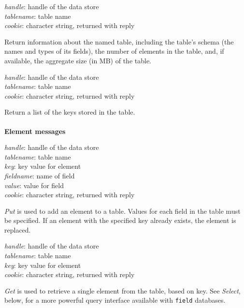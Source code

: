 {
\metP
    {\em handle}: handle of the data store\\
    {\em tablename}: table name\\
    {\em cookie}: character string, returned with reply

\metD
    Return information about the named table, including the table's schema
    (the names and types of its fields), the number of elements in the table,
    and, if available, the aggregate size (in MB) of the table.
}

{
\metP
    {\em handle}: handle of the data store\\
    {\em tablename}: table name\\
    {\em cookie}: character string, returned with reply

\metD
    Return a list of the keys stored in the table.
}

\paragraph{}
{\bf Element messages}

{
\metP
    {\em handle}: handle of the data store\\
    {\em tablename}: table name\\
    {\em key}: key value for element\\
    {\em fieldname}: name of field\\
    {\em value}: value for field\\
    {\em cookie}: character string, returned with reply

\metD
    {\em Put} is used to add an element to a table. Values for each
    field in the table must be specified. 
    If an element with the specified key already exists, the element is replaced.
}

{
\metP
    {\em handle}: handle of the data store\\
    {\em tablename}: table name\\
    {\em key}: key value for element\\
    {\em cookie}: character string, returned with reply

\metD
    {\em Get} is used to retrieve a single element from the table,
    based on key. See {\em Select}, below, for a more powerful query
    interface available with {\tt field} databases.
}

